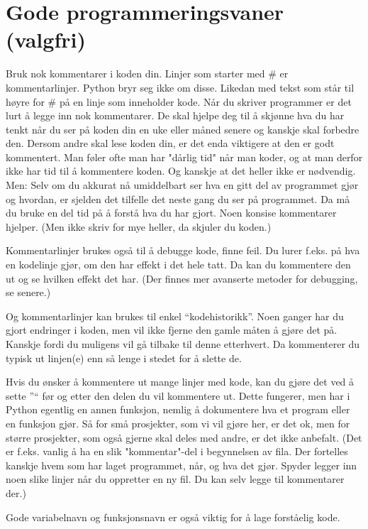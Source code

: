 {\section{Gode programmeringsvaner (valgfri)}

Bruk nok kommentarer i koden din. Linjer som starter med \# er kommentarlinjer. Python bryr seg ikke om disse. Likedan med tekst som står til høyre for \# på en linje som inneholder kode. Når du skriver programmer er det lurt å legge inn nok kommentarer. De skal hjelpe deg til å skjønne hva du har tenkt når du ser på koden din en uke eller måned senere og kanskje skal forbedre den. Dersom andre skal lese koden din, er det enda viktigere at den er godt kommentert. Man føler ofte man har "dårlig tid" når man koder, og at man derfor ikke har tid til å kommentere koden. Og kanskje at det heller ikke er nødvendig. Men: Selv om du akkurat nå umiddelbart ser hva en gitt del av programmet gjør og hvordan, er sjelden det tilfelle det neste gang du ser på programmet. Da må du bruke en del tid på å forstå hva du har gjort. Noen konsise kommentarer hjelper. (Men ikke skriv for mye heller, da skjuler du koden.) 

Kommentarlinjer brukes også til å debugge kode, finne feil. Du lurer f.eks. på hva en kodelinje gjør, om den har effekt i det hele tatt. Da kan du kommentere den ut og se hvilken effekt det har. (Der finnes mer avanserte metoder for debugging, se senere.)

Og kommentarlinjer kan brukes til enkel ``kodehistorikk''. Noen ganger har du gjort endringer i koden, men vil ikke fjerne den gamle måten å gjøre det på. Kanskje fordi du muligens vil gå tilbake til denne etterhvert. Da kommenterer du typisk ut linjen(e) enn så lenge i stedet for å slette de.

Hvis du ønsker å kommentere ut mange linjer med kode, kan du gjøre det ved å sette ''\textquotedbl`` før og etter den delen du vil kommentere ut. Dette fungerer, men har i Python egentlig en annen funksjon, nemlig å dokumentere hva et program eller en funksjon gjør. Så for små prosjekter, som vi vil gjøre her, er det ok, men for større prosjekter, som også gjerne skal deles med andre, er det ikke anbefalt.  (Det er f.eks. vanlig å ha en slik "kommentar"-del i begynnelsen av fila. Der fortelles kanskje hvem som har laget programmet, når, og hva det gjør. Spyder legger inn noen slike linjer når du oppretter en ny fil. Du kan selv legge til kommentarer der.) 

Gode variabelnavn og funksjonsnavn er også viktig for å lage forståelig kode.

}
